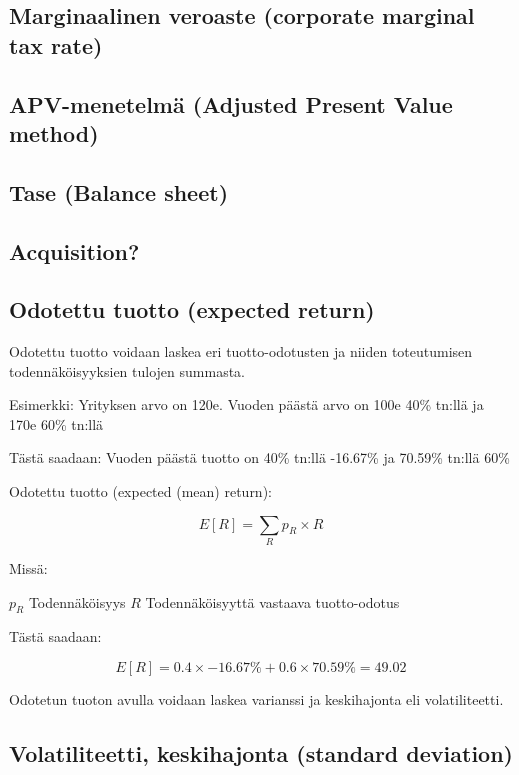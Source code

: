 \documentclass[a4paper]{article}
\begin{document}
\subsection{Marginaalinen veroaste (corporate marginal tax rate)}

\subsection{APV-menetelmä (Adjusted Present Value method)}

\subsection{Tase (Balance sheet)}

\subsection{Acquisition?}


\subsection{Odotettu tuotto (expected return)}

Odotettu tuotto voidaan laskea eri tuotto-odotusten ja niiden toteutumisen todennäköisyyksien tulojen summasta.

Esimerkki: Yrityksen arvo on 120e. Vuoden päästä arvo on 100e 40\% tn:llä ja 170e 60\% tn:llä

Tästä saadaan: Vuoden päästä tuotto on 40\% tn:llä -16.67\% ja 70.59\% tn:llä 60\%

Odotettu tuotto (expected (mean) return):

\[
E[R] = \sum_R{p_R \times R}
\]

Missä:

$p_R$ \quad Todennäköisyys
$R$ \quad Todennäköisyyttä vastaava tuotto-odotus

Tästä saadaan:

\[
E[R] = 0.4 \times -16.67\% + 0.6 \times 70.59\% = 49.02%
\]

Odotetun tuoton avulla voidaan laskea varianssi ja keskihajonta eli volatiliteetti.

\subsection{Volatiliteetti, keskihajonta (standard deviation)}
\end{document}
